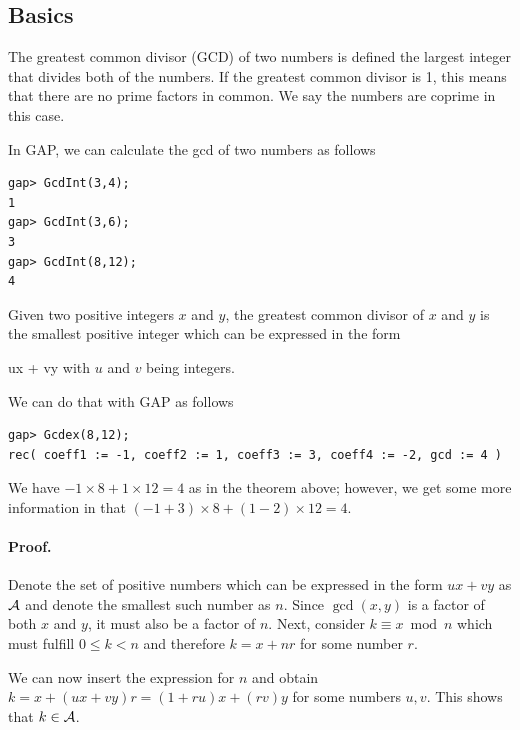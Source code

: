 
\subsection{Basics}

\begin{definition}
The greatest common divisor (GCD) of two numbers is defined the largest integer that divides both of the numbers. If the greatest common divisor is 1, this means that there are no prime factors in common. We say the numbers are coprime in this case.
\end{definition}

In GAP, we can calculate the gcd of two numbers as follows

\begin{verbatim}
gap> GcdInt(3,4);
1
gap> GcdInt(3,6);
3
gap> GcdInt(8,12);
4
\end{verbatim}

\begin{theorem} Given two positive integers $x$ and $y$, the greatest common divisor of $x$ and $y$ is the smallest positive integer which can be expressed in the form

\bee
ux + vy
\eee
%
with $u$ and $v$ being integers.
\end{theorem}

We can do that with GAP as follows

\begin{verbatim}
gap> Gcdex(8,12);
rec( coeff1 := -1, coeff2 := 1, coeff3 := 3, coeff4 := -2, gcd := 4 )
\end{verbatim}

We have $-1 \times 8 + 1 \times 12 = 4$ as in the theorem above; however, we get some more information in that $(-1 + 3) \times 8 + (1 - 2) \times 12 = 4$.

\paragraph{Proof.} Denote the set of positive numbers which can be expressed in the form $ux + vy$ as $\mathcal{A}$ and denote the smallest such number as $n$. Since $\gcd(x,y)$ is a factor of both $x$ and $y$, it must also be a factor of $n$. Next, consider $k \equiv x \bmod n$ which must fulfill $0 \leq k < n$ and therefore $k = x + nr$ for some number $r$. 

We can now insert the expression for $n$ and obtain $k = x + (ux + vy)r = (1+ru)x + (rv)y$ for some numbers $u, v$. This shows that $k \in \mathcal{A}$. 

